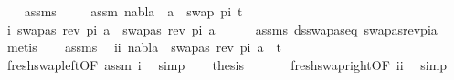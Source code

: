 \begin{isabellebody}
%
\isadelimproof
\ \ %
\endisadelimproof
%
\isatagproof
{}\isamarkupfalse%
\ assms\ \isanewline
{}\isamarkupfalse%
{\isacharminus}{\kern0pt}\isanewline
\ \ \isamarkupfalse%
\ assm{}{\isacharcolon}{\kern0pt}\ {\isachardoublequoteopen}nabla\ {\isasymturnstile}\ a\ {\isasymsharp}\ swap\ pi{}\ t{\isachardoublequoteclose}\isanewline
\ \ \isamarkupfalse%
\ i{\isacharcolon}{\kern0pt}\ {\isachardoublequoteopen}swapas\ {\isacharparenleft}{\kern0pt}rev\ pi{}{\isacharparenright}{\kern0pt}\ a\ {\isacharequal}{\kern0pt}\ swapas\ {\isacharparenleft}{\kern0pt}rev\ pi{}{\isacharparenright}{\kern0pt}\ a{\isachardoublequoteclose}\isanewline
\ \ \ \ \isamarkupfalse%
\ assms\ ds{\isacharunderscore}{\kern0pt}swapas{\isacharunderscore}{\kern0pt}eq\ swapas{\isacharunderscore}{\kern0pt}rev{\isacharunderscore}{\kern0pt}pi{\isacharunderscore}{\kern0pt}a\ \isamarkupfalse%
\ metis\isanewline
\ \ \isamarkupfalse%
\ assms\ \isamarkupfalse%
\ ii{\isacharcolon}{\kern0pt}\ {\isachardoublequoteopen}nabla\ {\isasymturnstile}\ swapas\ {\isacharparenleft}{\kern0pt}rev\ pi{}{\isacharparenright}{\kern0pt}\ a\ {\isasymsharp}\ t{\isachardoublequoteclose}\isanewline
\ \ \ \ \isamarkupfalse%
\ fresh{\isacharunderscore}{\kern0pt}swap{\isacharunderscore}{\kern0pt}left{\isacharbrackleft}{\kern0pt}OF\ assm{}{\isacharbrackright}{\kern0pt}\ i\ \isamarkupfalse%
\ simp\isanewline
\ \ \isamarkupfalse%
\ {\isacharquery}{\kern0pt}thesis\ \isanewline
\ \ \ \ \isamarkupfalse%
\ fresh{\isacharunderscore}{\kern0pt}swap{\isacharunderscore}{\kern0pt}right{\isacharbrackleft}{\kern0pt}OF\ ii{\isacharbrackright}{\kern0pt}\ \isamarkupfalse%
\ simp\isanewline
{}\isamarkupfalse%
%
\endisatagproof
{\isafoldproof}%
%
\isadelimproof
\isanewline
%
\endisadelimproof
\isanewline
%
\isadelimtheory
%
\endisadelimtheory
%
\isatagtheory
%
\endisatagtheory
{\isafoldtheory}%
%
\isadelimtheory
%
\endisadelimtheory
%
\end{isabellebody}%
\endinput
